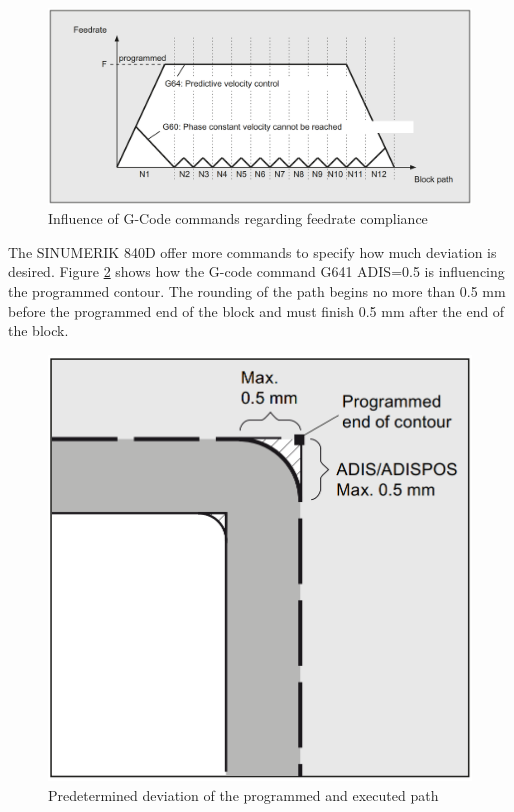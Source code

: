  \begin{figure}[H]
 	\centerline{\includegraphics[scale=0.25]{figures/conti1.png}}
 	\caption{Influence of G-Code commands regarding feedrate compliance~\cite{sinumericmanual}}
 	\label{C2}
 \end{figure}
 
The SINUMERIK 840D offer more commands to specify how much deviation is desired.
Figure \ref{C3} shows how the G-code command G641 ADIS=0.5 is influencing the programmed contour. The rounding of the path begins no more than 0.5 mm before the programmed end of the block and must finish 0.5 mm after the end of the block. 
 
 \begin{figure}[H]
 	\centerline{\includegraphics[scale=.25]{figures/conti2.png}}
 	\caption{Predetermined deviation of the programmed and executed path~\cite{sinumericmanual}}
 	\label{C3}
 \end{figure}
 
